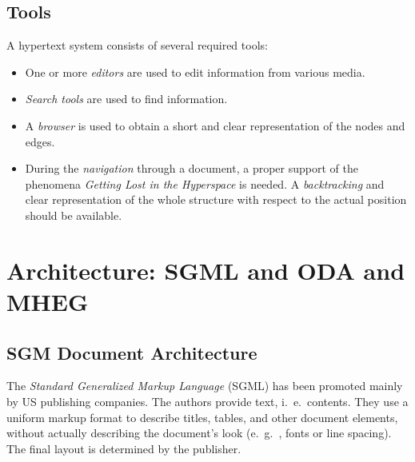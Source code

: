 \subsection*{Tools}
A hypertext system consists of several required tools:
\begin{multicols}{2}
	\begin{itemize}
		\item One or more \textit{editors} are used to edit information from various media.
		\item \textit{Search tools} are used to find information.
		\item A \textit{browser} is used to obtain a short and clear representation of the nodes and edges.
		\item During the \textit{navigation} through a document, a proper support of the phenomena \textit{Getting Lost in the Hyperspace} is needed. A \textit{backtracking} and clear representation	of the whole structure with respect to the actual position should be available.
	\end{itemize}
\end{multicols}

%
%
%
%
%
%


\section{Architecture: SGML and ODA and MHEG}
\subsection[SGML]{SGM Document Architecture}
The \textit{Standard Generalized Markup Language} (SGML) has been promoted mainly by US publishing companies. The authors provide text, i.\ e.\, contents. They use a uniform markup format to describe titles, tables, and other document elements, without actually describing the document's look (e.\ g.\ , fonts or line spacing). The final layout is determined by the publisher.

